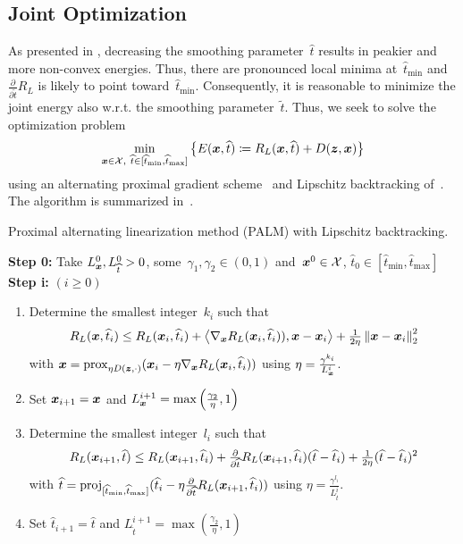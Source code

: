 \documentclass{article} %
\theoremstyle{plain}
\theoremstyle{definition}
\theoremstyle{remark}
\newcommand{\X}{\mathcal{X}}
\newcommand{\norm}[1]{\left\Vert#1\right\Vert}
\newcommand{\scal}[2]{\left\langle#1,#2\right\rangle}
\newcommand{\prox}{\mathrm{prox}}
\newcommand{\proj}{\mathrm{proj}}
\def\hatt{{\widehat{t}}}
\newcommand{\tminh}{\hatt_\mathrm{min}}
\newcommand{\tmaxh}{\hatt_\mathrm{max}}
\begin{document}
\subsection{Joint Optimization} \label{sec:jointOptimization}
As presented in , decreasing the smoothing parameter~$\widehat{t}$ results in peakier and more non-convex energies.
Thus, there are pronounced local minima at~$\tminh$ and $\frac{\partial}{\partial\widetilde{t}}R_L$ is likely to point toward~$\tminh$.
Consequently, it is reasonable to minimize the joint energy also w.r.t. the smoothing parameter~$\widetilde{t}$.
Thus, we seek to solve the optimization problem
\begin{align} \label{eq:jointEnergy}
\min_{\vx\in\X,\ \widehat{t}\in[\tminh,\tmaxh]} \left\{E(\vx,\widehat{t})\coloneqq R_L(\vx,\widehat{t}) + D(\vz,\vx)\right\}
\end{align}
using an alternating proximal gradient scheme~\citep{BoSa14} and Lipschitz backtracking of~\citet{BeTe09}.
The algorithm is summarized in~.

\begin{algorithm}[t]
\caption{Proximal alternating linearization method (PALM) with Lipschitz backtracking.}\label{alg:jointMinimization}
\textbf{Step 0:} Take $L_\vx^0,L_\hatt^0>0$, some~$\gamma_1,\gamma_2\in(0,1)$ and~$\vx^0\in\X$, $\hatt_0\in[\tminh,\tmaxh]$\\
\textbf{Step i:} $(i\geq 0)$ 
\begin{enumerate}
\item
Determine the smallest integer~$k_i$ such that 
\[
R_L(\vx,\hatt_i) \leq R_L(\vx_i,\hatt_i) + \scal{\nabla_\vx R_L(\vx_i,\hatt_i))}{\vx-\vx_i} + \tfrac{1}{2\eta}\norm{\vx-\vx_i}_2^2
\]
with $\vx = \prox_{\eta D(\vz,\cdot)}(\vx_i-\eta\nabla_\vx R_L(\vx_i,\hatt_i))$ using $\eta=\tfrac{\gamma^{k_i}}{L_{\bm{x}}^i}$.
\item
Set ${\bm{x}}_{i+1}={\bm{x}}$ and $L_{\bm{x}}^{i+1}=\max\left(\tfrac{\gamma_2}{\eta},1\right)$
\item
Determine the smallest integer~$l_i$ such that 
\[
R_L(\vx_{i+1},\hatt) \leq R_L(\vx_{i+1},\hatt_i) + \tfrac{\partial}{\partial\hatt} R_L(\vx_{i+1},\hatt_i)(\hatt-\hatt_i) + \tfrac{1}{2\eta}(\hatt-\hatt_i)^2
\]
with $\hatt = \proj_{[\tminh,\tmaxh]}(\hatt_i-\eta\tfrac{\partial}{\partial\hatt}R_L(\vx_{i+1},\hatt_i))$ using $\eta=\tfrac{\gamma^{l_i}}{L_\hatt^i}$.
\item
Set $\hatt_{i+1}=\hatt$ and $L_\hatt^{i+1}=\max\left(\tfrac{\gamma_2}{\eta},1\right)$
\end{enumerate}
\end{algorithm}
\end{document}
